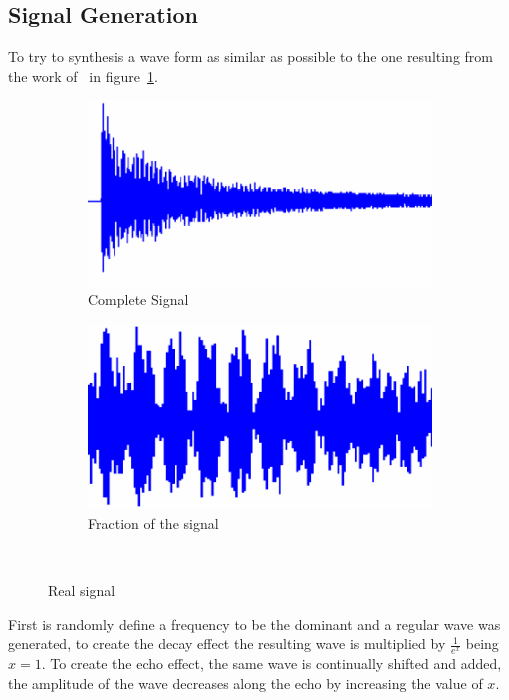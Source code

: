 \subsection{Signal Generation}\label{subsec:sigGen}
To try to synthesis a wave form as similar as possible to the one resulting from the work of~\citeauthor{wuLiquidLevelDetector2014b}\cite{wuLiquidLevelDetector2014b} in figure~\ref{fig:realsignalWu}.
\begin{figure}[]
    \centering
    \begin{subfigure}{0.45\textwidth}
        \includegraphics[width=\linewidth]{Chapters/6CHP/Figures/completesignalWu.pdf}
        \caption{Complete Signal}{}
    \end{subfigure}
    \begin{subfigure}{0.45\textwidth}
        \includegraphics[width=\linewidth]{Chapters/6CHP/Figures/fractionWu.pdf}
        \caption{Fraction of the signal}{}
    \end{subfigure}
    \caption{Real signal}{~\cite{wuLiquidLevelDetector2014b}}
     \label{fig:realsignalWu}
 \end{figure}
First is randomly define a frequency to be the dominant and a regular wave was generated, to create the decay effect the resulting wave is multiplied by $\frac{1}{e^{x}}$ being $x=1$. To create the echo effect, the same wave is continually shifted and added, the amplitude of the wave decreases along the echo by increasing the value of $x$.

